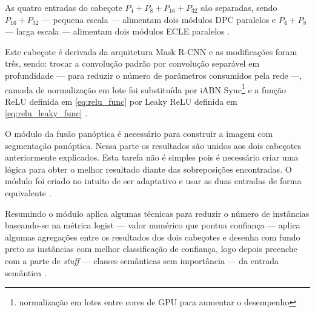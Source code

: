 As quatro entradas do cabeçote $ P_4 + P_8 + P_{16} + P_{32} $ são separadas, sendo $ P_{16} + P_{32} $ — pequena escala — alimentam dois módulos DPC paralelos e $ P_4 + P_8 $ — larga escala — alimentam dois módulos ECLE paralelos \space\cite{mohan2020efficientps}.


Este cabeçote é derivada da arquitetura Mask R-CNN e as modificações foram três, sendo: trocar a convolução padrão por convolução separável em profundidade — para reduzir o número de parâmetros consumidos pela rede —, camada de normalização em lote foi substituída por iABN Sync\footnote{normalização em lotes entre cores de GPU para aumentar o desempenho} e a função ReLU definida em \cref{eq:relu_func} por Leaky ReLU definida em \cref{eq:relu_leaky_func} \space\cite{mohan2020efficientps,redes-neurais-convolucionais-separaveis-em-profundidade, serp-ai}.


O módulo da fusão panóptica é necessário para construir a imagem com segmentação panóptica. Nessa parte os resultados são unidos aos dois cabeçotes anteriormente explicados. Esta tarefa não é simples pois é necessário criar uma lógica para obter o melhor resultado diante das sobreposições encontradas. O módulo foi criado no intuito de ser adaptativo e usar as duas entradas de forma equivalente \space\cite{mohan2020efficientps}.

Resumindo o módulo aplica algumas técnicas para reduzir o número de instâncias baseando-se na métrica logist — valor numérico que pontua confiança — aplica algumas agregações entre os resultados dos dois cabeçotes e desenha com fundo preto as instâncias com melhor classificação de confiança, logo depois preenche com a parte de \textit{stuff} — classes semânticas sem importância — da entrada semântica \space\cite{mohan2020efficientps}.